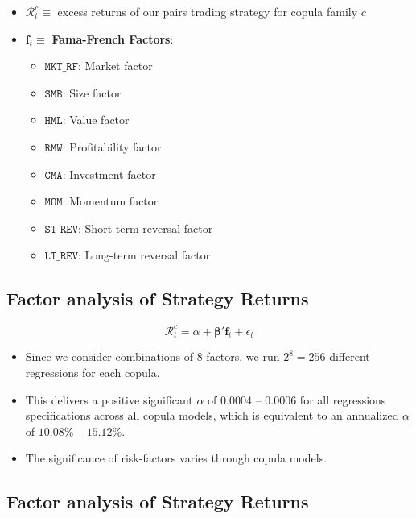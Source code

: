 \documentclass[
  letterpaper,
  DIV=11,
  numbers=noendperiod]{scrartcl}
\providecommand{\tightlist}{%
  \setlength{\itemsep}{0pt}\setlength{\parskip}{0pt}}\usepackage{longtable,booktabs,array}
\begin{document}
\begin{itemize}
\tightlist
\item
  \(\mathcal{R}_{t}^{c}\equiv\) excess returns of our pairs trading
  strategy for copula family \(c\)
\item
  \(\mathbf f_t \equiv\) \textbf{Fama-French Factors}:

  \begin{itemize}
  \tightlist
  \item
    \(\texttt{MKT_RF}\): Market factor
  \item
    \(\texttt{SMB}\): Size factor
  \item
    \(\texttt{HML}\): Value factor
  \item
    \(\texttt{RMW}\): Profitability factor
  \item
    \(\texttt{CMA}\): Investment factor
  \item
    \(\texttt{MOM}\): Momentum factor
  \item
    \(\texttt{ST_REV}\): Short-term reversal factor
  \item
    \(\texttt{LT_REV}\): Long-term reversal factor
  \end{itemize}
\end{itemize}

\subsection{Factor analysis of Strategy
Returns}\label{factor-analysis-of-strategy-returns-1}

\[
\mathcal{R}_{t}^{c} = \alpha + \boldsymbol{\beta}' \mathbf{f}_t + \epsilon_t
\]

\begin{itemize}
\tightlist
\item
  Since we consider combinations of 8 factors, we run \(2^8=256\)
  different regressions for each copula.
\item
  This delivers a positive significant \(\alpha\) of \(0.0004\) --
  \(0.0006\) for all regressions specifications across all copula
  models, which is equivalent to an annualized \(\alpha\) of \(10.08\%\)
  -- \(15.12\%\).
\item
  The significance of risk-factors varies through copula models.
\end{itemize}

\subsection{Factor analysis of Strategy
Returns}\label{factor-analysis-of-strategy-returns-2}
\end{document}
